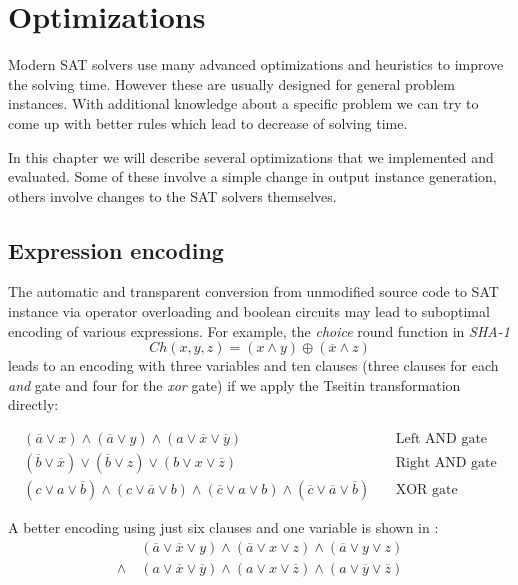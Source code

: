 \chapter{Optimizations}

Modern SAT solvers use many advanced optimizations and heuristics to improve the solving time.
However these are usually designed for general problem instances.
With additional knowledge about a specific problem we can try to come up with better rules which lead to decrease of solving time.

In this chapter we will describe several optimizations that we implemented and evaluated.
Some of these involve a simple change in output instance generation, others involve changes to the SAT solvers themselves.

\section{Expression encoding}
\label{sec:expression-encoding}
The automatic and transparent conversion from unmodified source code to SAT instance via operator overloading and boolean circuits may lead to suboptimal encoding of various expressions.
For example, the \emph{choice} round function in \emph{SHA-1}
\[
Ch(x, y, z) = (x \land y) \oplus (\overline{x} \land z)
\]
leads to an encoding with three variables and ten clauses (three clauses for each \emph{and} gate and four for the \emph{xor} gate) if we apply the Tseitin transformation directly:

\begin{align*}
(\overline{a} \lor x) \land (\overline{a} \lor y) \land (a \lor \overline{x} \lor \overline{y}) &~& \text{Left AND gate}\\
(\overline{b} \lor \overline{x}) \lor (\overline{b} \lor z) \lor (b \lor x \lor \overline{z})&~& \text{Right AND gate} \\
(c \lor a \lor \overline{b}) \land (c \lor \overline{a} \lor b) \land (\overline{c} \lor a \lor b) \land (\overline{c} \lor \overline{a} \lor \overline{b}) &~& \text{XOR gate}
\end{align*}

A better encoding using just six clauses and one variable is shown in \cite{nossum2012sat}:
\begin{align*}
&(\overline{a} \lor \overline{x} \lor y) \land (\overline{a} \lor x \lor z) \land (\overline{a} \lor y \lor z) \\
\land~ &(a \lor \overline{x} \lor \overline{y}) \land (a \lor x \lor \overline{z}) \land (a \lor \overline{y} \lor \overline{z})
\end{align*}

